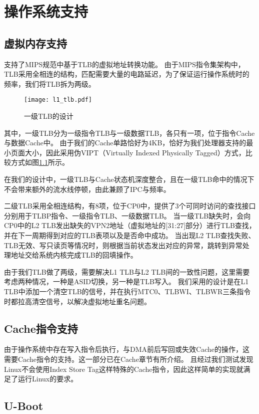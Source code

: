 \chapter{操作系统支持}

\section{虚拟内存支持}

\cpuname 支持了MIPS规范中基于TLB的虚拟地址转换功能。
由于MIPS指令集架构中，TLB采用全相连的结构，匹配需要大量的电路延迟，为了保证运行操作系统时的频率，我们将TLB拆为两级。

\begin{figure}[h]
    \centering
    \texttt{[image: l1\_tlb.pdf]}
    \caption{一级TLB的设计}
    \label{img:l1_tlb}
\end{figure}

其中，一级TLB分为一级指令TLB与一级数据TLB，各只有一项，位于指令Cache与数据Cache中。
由于我们的Cache单路恰好为4KB，恰好为我们处理器支持的最小页面大小，因此采用伪VIPT（Virtually Indexed Physically Tagged）方式，比较方式如图\ref{img:l1_tlb}所示。

在我们的设计中，一级TLB与Cache状态机深度整合，且在一级TLB命中的情况下不会带来额外的流水线停顿，由此兼顾了IPC与频率。

二级TLB采用全相连结构，有8项，位于CP0中，提供了3个可同时访问的查找接口分别用于TLBP指令、一级指令TLB、一级数据TLB。
当一级TLB缺失时，会向CP0中的L2 TLB发出缺失的VPN2地址（虚拟地址的[31:27]部分）进行TLB查找，并在下一周期得到对应的TLB表项以及是否命中成功。
当出现L2 TLB查找失败、TLB无效、写只读页等情况时，则根据当前状态发出对应的异常，跳转到异常处理地址交给系统内核完成TLB的回填操作。

由于我们TLB做了两级，需要解决L1 TLB与L2 TLB间的一致性问题，这里需要考虑两种情况，一种是ASID切换，另一种是TLB写入。
我们采用的设计是在L1 TLB中添加一个清空TLB的信号，并在执行MTC0、TLBWI、TLBWR三条指令时都拉高清空信号，以解决虚拟地址重名问题。

\section{Cache指令支持}

由于操作系统中存在写入指令后执行，与DMA前后写回或失效Cache的操作，这需要Cache指令的支持。这一部分已在Cache章节有所介绍。
且经过我们测试发现Linux不会使用Index Store Tag这样特殊的Cache指令，因此这样简单的实现就满足了运行Linux的要求。

\section{U-Boot}

